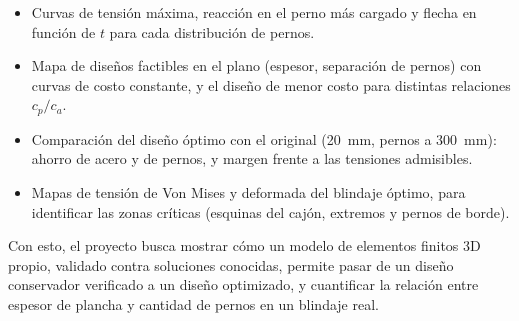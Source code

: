 \documentclass[11pt]{article}
\begin{document}
\begin{itemize}[leftmargin=1.3em, itemsep=2pt]
  \item Curvas de tensi\'on m\'axima, reacci\'on en el perno m\'as cargado y flecha en funci\'on de
        $t$ para cada distribuci\'on de pernos.
  \item Mapa de dise\~nos factibles en el plano (espesor, separaci\'on de pernos) con curvas de costo
        constante, y el dise\~no de menor costo para distintas relaciones $c_p/c_a$.
  \item Comparaci\'on del dise\~no \'optimo con el original (20~mm, pernos a 300~mm): ahorro de acero y
        de pernos, y margen frente a las tensiones admisibles.
  \item Mapas de tensi\'on de Von Mises y deformada del blindaje \'optimo, para identificar las zonas
        cr\'iticas (esquinas del caj\'on, extremos y pernos de borde).
\end{itemize}

Con esto, el proyecto busca mostrar c\'omo un modelo de elementos finitos 3D propio, validado contra
soluciones conocidas, permite pasar de un dise\~no conservador verificado a un dise\~no optimizado, y
cuantificar la relaci\'on entre espesor de plancha y cantidad de pernos en un blindaje real.
\end{document}
